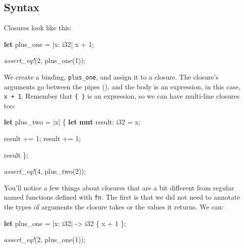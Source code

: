 \documentclass[a4paper,]{book}
\newenvironment{Shaded}{\begin{snugshade}}{\end{snugshade}}
\newcommand{\KeywordTok}[1]{\textcolor[rgb]{0.13,0.29,0.53}{\textbf{{#1}}}}
\newcommand{\DataTypeTok}[1]{\textcolor[rgb]{0.13,0.29,0.53}{{#1}}}
\newcommand{\DecValTok}[1]{\textcolor[rgb]{0.00,0.00,0.81}{{#1}}}
\newcommand{\PreprocessorTok}[1]{\textcolor[rgb]{0.56,0.35,0.01}{\textit{{#1}}}}
\newcommand{\NormalTok}[1]{{#1}}
\begin{document}
\subsection{Syntax}\label{syntax}

Closures look like this:

\begin{Shaded}
\begin{Highlighting}[]
\KeywordTok{let} \NormalTok{plus_one = |x: }\DataTypeTok{i32}\NormalTok{| x + }\DecValTok{1}\NormalTok{;}

\PreprocessorTok{assert_eq!}\NormalTok{(}\DecValTok{2}\NormalTok{, plus_one(}\DecValTok{1}\NormalTok{));}
\end{Highlighting}
\end{Shaded}

We create a binding, \texttt{plus\_one}, and assign it to a closure. The
closure's arguments go between the pipes (\texttt{\textbar{}}), and the
body is an expression, in this case, \texttt{x\ +\ 1}. Remember that
\texttt{\{\ \}} is an expression, so we can have multi-line closures
too:

\begin{Shaded}
\begin{Highlighting}[]
\KeywordTok{let} \NormalTok{plus_two = |x| \{}
    \KeywordTok{let} \KeywordTok{mut} \NormalTok{result: }\DataTypeTok{i32} \NormalTok{= x;}

    \NormalTok{result += }\DecValTok{1}\NormalTok{;}
    \NormalTok{result += }\DecValTok{1}\NormalTok{;}

    \NormalTok{result}
\NormalTok{\};}

\PreprocessorTok{assert_eq!}\NormalTok{(}\DecValTok{4}\NormalTok{, plus_two(}\DecValTok{2}\NormalTok{));}
\end{Highlighting}
\end{Shaded}

You'll notice a few things about closures that are a bit different from
regular named functions defined with \texttt{fn}. The first is that we
did not need to annotate the types of arguments the closure takes or the
values it returns. We can:

\begin{Shaded}
\begin{Highlighting}[]
\KeywordTok{let} \NormalTok{plus_one = |x: }\DataTypeTok{i32}\NormalTok{| -> }\DataTypeTok{i32} \NormalTok{\{ x + }\DecValTok{1} \NormalTok{\};}

\PreprocessorTok{assert_eq!}\NormalTok{(}\DecValTok{2}\NormalTok{, plus_one(}\DecValTok{1}\NormalTok{));}
\end{Highlighting}
\end{Shaded}
\end{document}
